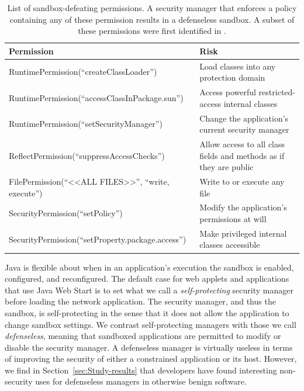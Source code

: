\documentclass{sig-alternate}
\begin{document}
\begin{table}
\caption{List of sandbox-defeating permissions. A security manager that enforces
a policy containing any of these permission results
\label{tab:defenseless-permissions}
in a defenseless sandbox. A subset of these permissions were first identified in \cite{security_explorations_2012}. 
}
\begin{tabular}{ll}
\toprule 
\textbf{Permission} & \textbf{Risk}\tabularnewline
\midrule
RuntimePermission(``createClassLoader'') & Load classes into any protection domain\tabularnewline
RuntimePermission(``accessClassInPackage.sun'') & Access powerful restricted-access internal classes\tabularnewline
RuntimePermission(``setSecurityManager'') & Change the application's current security manager\tabularnewline
ReflectPermission(``suppressAccessChecks'') & Allow access to all class fields and methods as if they are public\tabularnewline
FilePermission(``<\textcompwordmark{}<ALL FILES>\textcompwordmark{}>'',
``write, execute'') & Write to or execute any file\tabularnewline
SecurityPermission(``setPolicy'') & Modify the application's permissions at will\tabularnewline
SecurityPermission(``setProperty.package.access'') & Make privileged internal classes accessible\tabularnewline
\bottomrule
\end{tabular}
\vspace{-0.5cm}
\end{table}

Java is flexible about when in an application's execution the sandbox
is enabled, configured, and reconfigured. The default case for web applets and applications
that use Java Web Start is to set what we call a \textit{self-protecting} security
manager before loading the network application. The security
manager, and thus the sandbox, is self-protecting in the sense that
it does not allow the application to change sandbox settings. We contrast
self-protecting managers with those we call 
\textit{defenseless}, meaning that sandboxed applications are 
permitted to modify or disable the security manager.  
A defenseless manager is virtually useless in terms of improving the
security of either a constrained application or its host. However, we find
in Section~\ref{sec:Study-results} that developers
have found interesting non-security uses for defenseless managers in otherwise
benign software.
\end{document}
